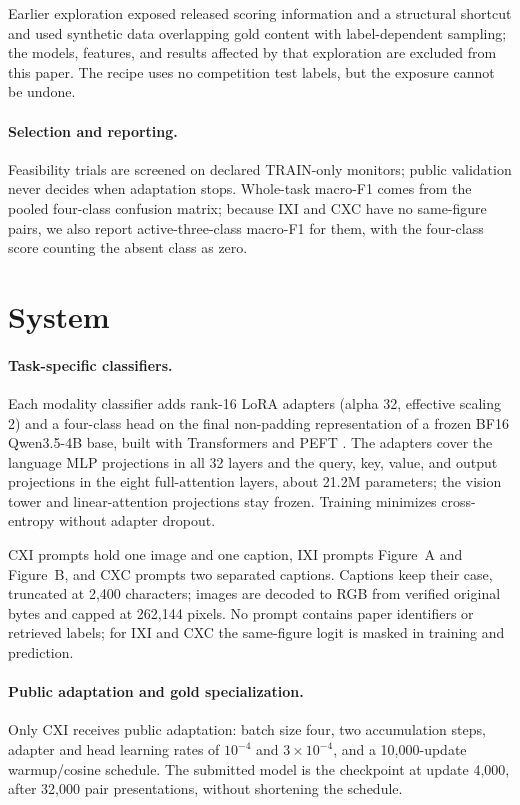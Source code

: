 Earlier exploration exposed released scoring information and a structural shortcut and used synthetic data overlapping gold content with label-dependent sampling; the models, features, and results affected by that exploration are excluded from this paper. The recipe uses no competition test labels, but the exposure cannot be undone.

\paragraph{Selection and reporting.}
Feasibility trials are screened on declared TRAIN-only monitors; public validation never decides when adaptation stops. Whole-task macro-F1 comes from the pooled four-class confusion matrix; because IXI and CXC have no same-figure pairs, we also report active-three-class macro-F1 for them, with the four-class score counting the absent class as zero.

\section{System}

\paragraph{Task-specific classifiers.}
Each modality classifier adds rank-16 LoRA adapters (alpha 32, effective scaling 2) and a four-class head on the final non-padding representation of a frozen BF16 Qwen3.5-4B base, built with Transformers \citep{wolf-etal-2020-transformers} and PEFT \citep{peft}. The adapters cover the language MLP projections in all 32 layers and the query, key, value, and output projections in the eight full-attention layers, about 21.2M parameters; the vision tower and linear-attention projections stay frozen. Training minimizes cross-entropy without adapter dropout.

CXI prompts hold one image and one caption, IXI prompts Figure~A and Figure~B, and CXC prompts two separated captions. Captions keep their case, truncated at 2,400 characters; images are decoded to RGB from verified original bytes and capped at 262,144 pixels. No prompt contains paper identifiers or retrieved labels; for IXI and CXC the same-figure logit is masked in training and prediction.

\paragraph{Public adaptation and gold specialization.}
Only CXI receives public adaptation: batch size four, two accumulation steps, adapter and head learning rates of $10^{-4}$ and $3\!\times\!10^{-4}$, and a 10,000-update warmup/cosine schedule. The submitted model is the checkpoint at update 4,000, after 32,000 pair presentations, without shortening the schedule.

